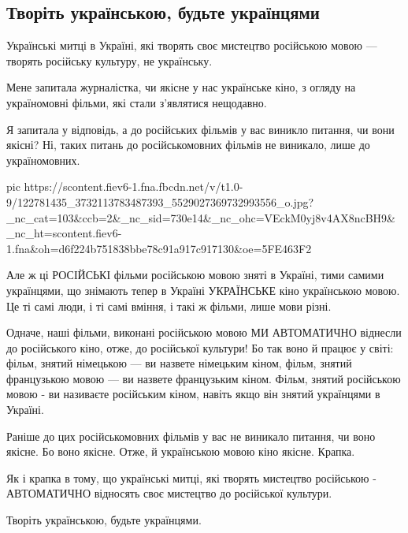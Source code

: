  
 
 
 
 
 
\subsection{Творіть українською, будьте українцями}
\label{sec:29_10_2020.fb.nitsoi_larysa.1.tvorit_ukrainskoju}

Українські митці в Україні, які творять своє мистецтво російською мовою --- творять російську культуру, не українську. 

Мене запитала журналістка, чи якісне у нас українське кіно, з огляду на україномовні фільми, які стали з’являтися нещодавно.

Я запитала у відповідь, а до російських фільмів у вас виникло питання, чи вони
якісні? Ні, таких питань до російськомовних фільмів не виникало, лише до
україномовних.

\ifcmt
pic https://scontent.fiev6-1.fna.fbcdn.net/v/t1.0-9/122781435_3732113783487393_5529027369732993556_o.jpg?_nc_cat=103&ccb=2&_nc_sid=730e14&_nc_ohc=VEckM0yj8v4AX8ncBH9&_nc_ht=scontent.fiev6-1.fna&oh=d6f224b751838bbe78c91a917c917130&oe=5FE463F2
\fi

Але ж ці РОСІЙСЬКІ фільми російською мовою зняті в Україні, тими самими
українцями, що знімають тепер в Україні УКРАЇНСЬКЕ кіно українською мовою. Це
ті самі люди, і ті самі вміння, і такі ж фільми, лише мови різні. 

Одначе, наші фільми, виконані російською мовою МИ АВТОМАТИЧНО віднесли до
російського кіно, отже, до російської культури! Бо так воно й працює у світі:
фільм, знятий німецькою --- ви назвете німецьким кіном, фільм, знятий французькою
мовою --- ви назвете французьким кіном. Фільм, знятий російською мовою - ви
називаєте російським кіном, навіть якщо він знятий українцями в Україні. 

Раніше до цих російськомовних фільмів у вас не виникало питання, чи воно
якісне. Бо воно якісне. Отже, й українською мовою кіно якісне. Крапка.

Як і крапка в тому, що українські митці, які творять мистецтво російською -
АВТОМАТИЧНО відносять своє мистецтво до російської культури. 

Творіть українською, будьте українцями.

